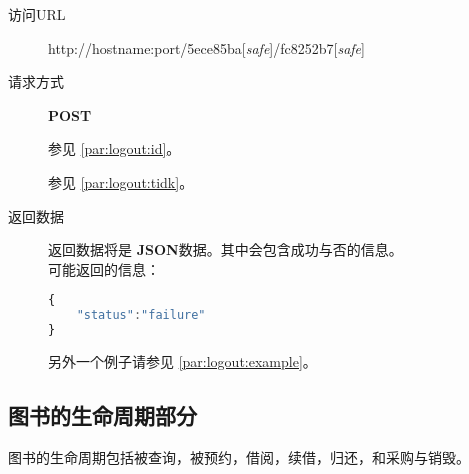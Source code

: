 \documentclass[UTF8]{ctexart}
\def\safe{[\textit{safe}]}
\def\POST{\textbf{POST}}
\def\bfJSON{\textbf{JSON}}
\begin{document}
        
        
        
        
        \begin{description}
            \item[访问URL] http://hostname:port/5ece85ba\safe/fc8252b7\safe
            
            \item[请求方式] \POST
            
            参见 \ref{par:logout:id}。
            
            参见 \ref{par:logout:tidk}。
            
            
            \item[返回数据] 返回数据将是 \bfJSON 数据。其中会包含成功与否的信息。
            \\可能返回的信息：
            \begin{lstlisting}[language=JavaScript]
{
    "status":"failure"
}
            \end{lstlisting}
            另外一个例子请参见 \ref{par:logout:example}。
        \end{description}
        
        
        
        
        
        
        \subsection{图书的生命周期部分}
        图书的生命周期包括被查询，被预约，借阅，续借，归还，和采购与销毁。
        
        
        
        
        
\end{document}
